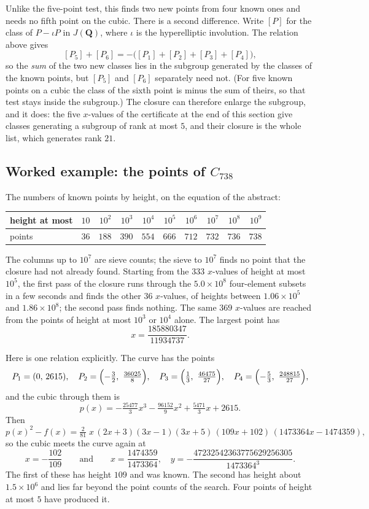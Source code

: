 \documentclass[11pt]{article}
\newcommand{\Q}{\mathbf{Q}}
\theoremstyle{remark}
\begin{document}
Unlike the five-point test, this finds two new points from four known ones and needs no fifth point on the cubic.  There is
a second difference.  Write $[P]$ for the class of $P-\iota P$ in $J(\Q)$, where $\iota$ is the hyperelliptic involution.  The
relation above gives
\[
[P_5]+[P_6]=-\bigl([P_1]+[P_2]+[P_3]+[P_4]\bigr),
\]
so the \emph{sum} of the two new classes lies in the subgroup generated by the classes of the known points, but $[P_5]$ and
$[P_6]$ separately need not.  (For five known points on a cubic the class of the sixth point is minus the sum of theirs, so that test
stays inside the subgroup.)  The closure can therefore enlarge the subgroup, and it does: the five $x$-values of the
certificate at the end of this section give classes generating a subgroup of rank at most $5$, and their closure is the whole
list, which generates rank $21$.

\subsection*{Worked example: the points of $C_{738}$}
The numbers of known points by height, on the equation of the abstract:
\begin{center}
\begin{tabular}{lrrrrrrrrr}
\toprule
height at most & $10$ & $10^2$ & $10^3$ & $10^4$ & $10^5$ & $10^6$ & $10^7$ & $10^8$ & $10^9$\\
\midrule
points & $36$ & $188$ & $390$ & $554$ & $666$ & $712$ & $732$ & $736$ & $738$\\
\bottomrule
\end{tabular}
\end{center}
The columns up to $10^7$ are sieve counts; the sieve to $10^7$ finds no point that the closure had not already found.
Starting from the $333$ $x$-values of height at most $10^5$, the first pass of the closure runs through the $5.0\times 10^8$
four-element subsets in a few seconds and finds the other $36$ $x$-values, of heights between $1.06\times10^5$ and $1.86\times10^8$;
the second pass finds nothing.  The same $369$ $x$-values are reached from the points of height at most $10^3$ or $10^4$ alone.
The largest point has
\[
x=\frac{185880347}{11934737}.
\]

Here is one relation explicitly.  The curve has the points
\[
P_1=(0,\,2615),\quad P_2=\Bigl(-\tfrac32,\ \tfrac{36025}{8}\Bigr),\quad P_3=\Bigl(\tfrac13,\ \tfrac{46475}{27}\Bigr),\quad
P_4=\Bigl(-\tfrac53,\ \tfrac{248815}{27}\Bigr),
\]
and the cubic through them is
\[
p(x)=-\tfrac{25477}{3}x^3-\tfrac{96152}{9}x^2+\tfrac{5471}{3}x+2615 .
\]
Then
\[
p(x)^2-f(x)=\tfrac{2}{81}\;x\,(2x+3)(3x-1)(3x+5)\,(109x+102)\,(1473364x-1474359),
\]
so the cubic meets the curve again at
\[
x=-\frac{102}{109}\qquad\text{and}\qquad x=\frac{1474359}{1473364},\quad y=-\frac{47232542363775629256305}{1473364^3}.
\]
The first of these has height $109$ and was known.  The second has height about $1.5\times10^6$ and lies far beyond the point
counts of the search.  Four points of height at most $5$ have produced it.
\end{document}
